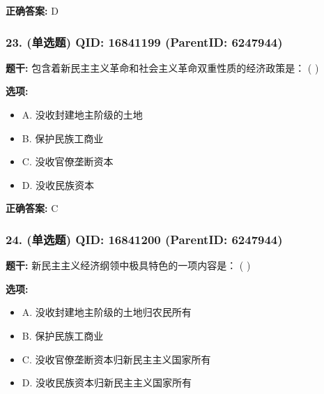 \documentclass[12pt,UTF8]{ctexart}
\begin{document}
\textbf{正确答案:}
D

\vspace{0.3em}\hrulefill\vspace{0.7em}

\subsubsection*{23. (单选题) \small QID: 16841199 (ParentID: 6247944)}

\textbf{题干:}
包含着新民主主义革命和社会主义革命双重性质的经济政策是： ( )



\textbf{选项:}
\begin{itemize}[leftmargin=*]

  \item A. 没收封建地主阶级的土地

  \item B. 保护民族工商业

  \item C. 没收官僚垄断资本

  \item D. 没收民族资本

\end{itemize}

\textbf{正确答案:}
C

\vspace{0.3em}\hrulefill\vspace{0.7em}

\subsubsection*{24. (单选题) \small QID: 16841200 (ParentID: 6247944)}

\textbf{题干:}
新民主主义经济纲领中极具特色的一项内容是： ( )



\textbf{选项:}
\begin{itemize}[leftmargin=*]

  \item A. 没收封建地主阶级的土地归农民所有

  \item B. 保护民族工商业

  \item C. 没收官僚垄断资本归新民主主义国家所有

  \item D. 没收民族资本归新民主主义国家所有

\end{itemize}
\end{document}

